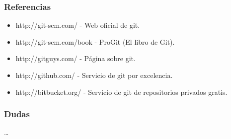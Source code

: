 \documentclass[10pt]{beamer}
\begin{document}
  \begin{frame}
    \frametitle{Referencias}
    \begin{itemize}
      \item \small{http://git-scm.com/ - Web oficial de git.}
      \item \small{http://git-scm.com/book - ProGit (El libro de Git).}
      \item \small{http://gitguys.com/ - Página sobre git.}
      \item \small{http://github.com/ - Servicio de git por excelencia.}
      \item \small{http://bitbucket.org/ - Servicio de git de repositorios privados gratis.}
    \end{itemize}
  \end{frame}

  \begin{frame}
    \frametitle{Dudas}
    \dots
  \end{frame}
\end{document}
